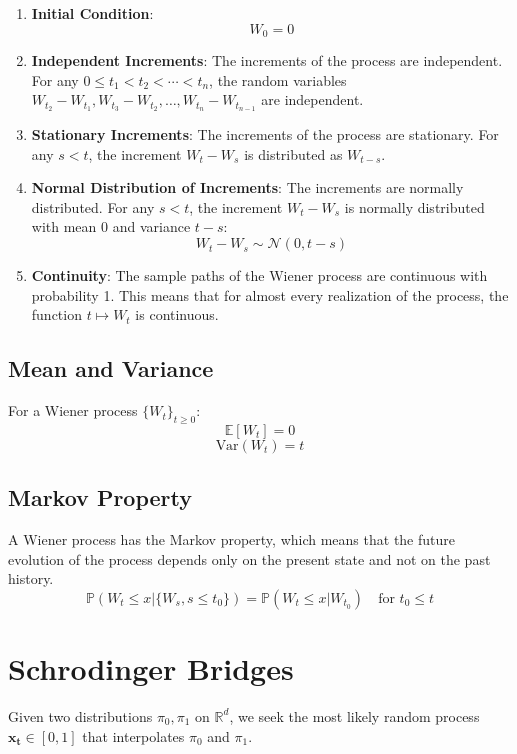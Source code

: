 \documentclass[12pt]{article}
\begin{document}
\begin{enumerate}
    \item \textbf{Initial Condition}:
    \[
    W_0 = 0
    \]
    \item \textbf{Independent Increments}:
    The increments of the process are independent. For any \( 0 \leq t_1 < t_2 < \cdots < t_n \), the random variables \( W_{t_2} - W_{t_1}, W_{t_3} - W_{t_2}, \ldots, W_{t_n} - W_{t_{n-1}} \) are independent.
    \item \textbf{Stationary Increments}:
    The increments of the process are stationary. For any \( s < t \), the increment \( W_t - W_s \) is distributed as \( W_{t-s} \).
    \item \textbf{Normal Distribution of Increments}:
    The increments are normally distributed. For any \( s < t \), the increment \( W_t - W_s \) is normally distributed with mean 0 and variance \( t - s \):
    \[
    W_t - W_s \sim \mathcal{N}(0, t - s)
    \]
    \item \textbf{Continuity}:
    The sample paths of the Wiener process are continuous with probability 1. This means that for almost every realization of the process, the function \( t \mapsto W_t \) is continuous.
\end{enumerate}

\subsection{Mean and Variance}

For a Wiener process \( \{W_t\}_{t \geq 0} \):
\[
\mathbb{E}[W_t] = 0
\]
\[
\text{Var}(W_t) = t
\]

\subsection{Markov Property}

A Wiener process has the Markov property, which means that the future evolution of the process depends only on the present state and not on the past history.
\[
\mathbb{P}(W_t \leq x | \{W_s, s \leq t_0\}) = \mathbb{P}(W_t \leq x | W_{t_0}) \quad \text{for } t_0 \leq t
\]



\section{Schrodinger Bridges}
Given two distributions \(\pi_0, \pi_1\) on \(\mathbb{R}^d\), we seek the most likely random process \(\mathbf{x_t} \in [0,1]\) that interpolates \(\pi_0\) and \( \pi_1\). \\
\end{document}
